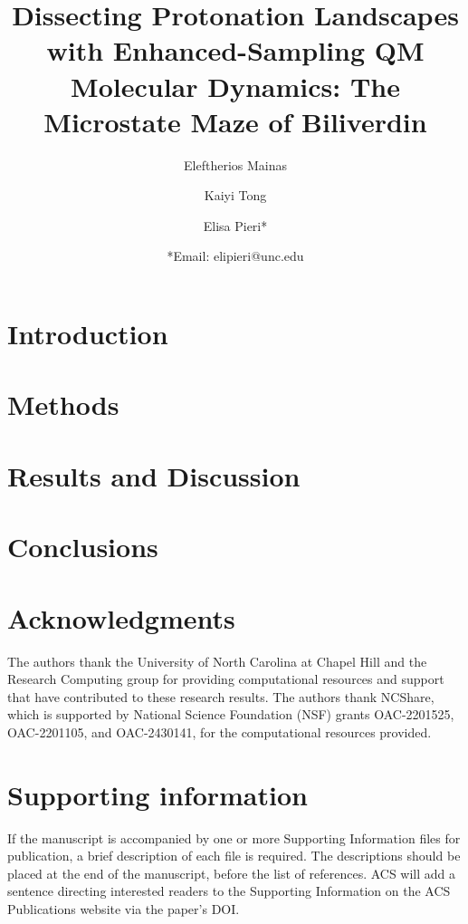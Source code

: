 \documentclass[letterpaper]{article}
\author[1]{Eleftherios Mainas}
\author[1]{Kaiyi Tong}
\author[1]{Elisa Pieri*}
\affil[1]{Department of Chemistry, University of North Carolina at Chapel Hill, Chapel Hill}
\title{Dissecting Protonation Landscapes with Enhanced-Sampling QM Molecular Dynamics: The Microstate Maze of Biliverdin}
\date{*Email: elipieri@unc.edu}
\begin{document}
\maketitle

\begin{abstract}

\end{abstract}

\section{Introduction}


\section{Methods}


\section{Results and Discussion}


\section{Conclusions}


\section*{Acknowledgments}

The authors thank the University of North Carolina at Chapel Hill and the Research Computing group for providing computational resources and support that have contributed to these research results. The authors thank NCShare, which is supported by National Science Foundation (NSF) grants OAC-2201525, OAC-2201105, and OAC-2430141, for the computational resources provided.

\section*{Supporting information}

If the manuscript is accompanied by one or more Supporting Information files for publication, a brief description of each file is required. The descriptions should be placed at the end of the manuscript, before the list of references. ACS will add a sentence directing interested readers to the Supporting Information on the ACS Publications website via the paper’s DOI.
\end{document}
